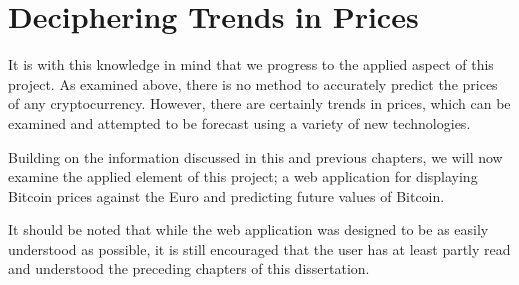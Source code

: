 \section{Deciphering Trends in Prices}
It is with this knowledge in mind that we progress to the applied aspect of this project. As examined above, there is no method to accurately predict the prices of any cryptocurrency. However, there are certainly trends in prices, which can be examined and attempted to be forecast using a variety of new technologies. 

Building on the information discussed in this and previous chapters, we will now examine the applied element of this project; a web application for displaying Bitcoin prices against the Euro and predicting future values of Bitcoin. 

It should be noted that while the web application was designed to be as easily understood as possible, it is still encouraged that the user has at least partly read and understood the preceding chapters of this dissertation.
